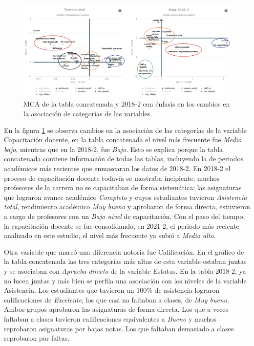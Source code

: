 \documentclass[mathematics,article,submit,moreauthors,pdftex]{mdpi}
\begin{document}
\begin{figure}[H]


\begin{center}\includegraphics[width=0.9\linewidth,]{comp_edu} \end{center}

\caption{MCA de la tabla concatenada y 2018-2 con énfasis en los cambios en la asociación de categorías de las variables.}
\label{fig:compedu}
\end{figure}

En la figura \ref{fig:compedu} se observa cambios en la asociación de
las categorías de la variable Capacitación docente, en la tabla
concatenada el nivel más frecuente fue \emph{Medio bajo}, mientras que
en la 2018-2, fue \emph{Bajo.} Esto se explica porque la tabla
concatenada contiene información de todas las tablas, incluyendo la de
periodos académicos más recientes que enmascaran los datos de 2018-2. En
2018-2 el proceso de capacitación docente todavía se mostraba
incipiente, muchos profesores de la carrera no se capacitaban de forma
sistemática; las asignaturas que lograron avance académico
\emph{Completo} y cuyos estudiantes tuvieron \emph{Asistencia total},
rendimiento académico \emph{Muy bueno} y aprobaron de forma directa,
estuvieron a cargo de profesores con un \emph{Bajo nivel} de
capacitación. Con el paso del tiempo, la capacitación docente se fue
consolidando, en 2021-2, el periodo más reciente analizado en este
estudio, el nivel más frecuente ya subió a \emph{Medio alto}.

Otra variable que marcó una diferencia notoria fue Calificación. En el
gráfico de la tabla concatenada las tres categorías más altas de esta
variable estaban juntas y se asociaban con \emph{Aprueba directo} de la
variable Estatus. En la tabla 2018-2, ya no lucen juntas y más bien se
perfila una asociación con los niveles de la variable Asistencia. Los
estudiantes que tuvieron un 100\% de asistencia lograron calificaciones
de \emph{Excelente}, los que casi no faltaban a clases, de \emph{Muy
bueno}. Ambos grupos aprobaron las asignaturas de forma directa. Los que
a veces faltaban a clases tuvieron calificaciones equivalentes a
\emph{Bueno} y muchos reprobaron asignaturas por bajas notas. Los que
faltaban demasiado a clases reprobaron por faltas.
\end{document}
